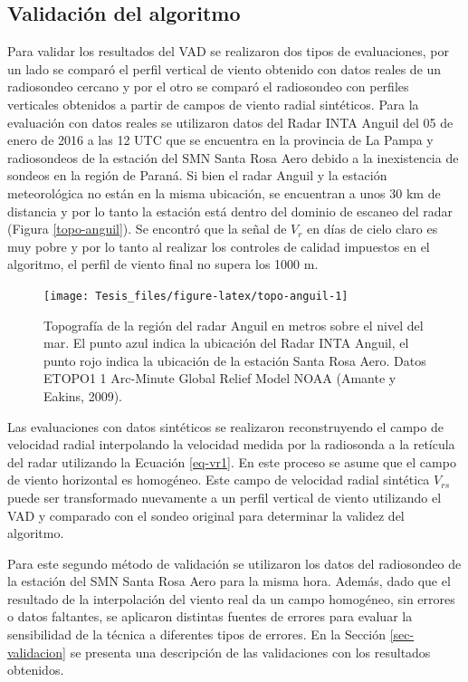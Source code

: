 \documentclass[12pt,spanish,oneside, a4paper]{book}
\begin{document}
\subsection{Validación del algoritmo}\label{validacion-del-algoritmo}

Para validar los resultados del VAD se realizaron dos tipos de
evaluaciones, por un lado se comparó el perfil vertical de viento
obtenido con datos reales de un radiosondeo cercano y por el otro se
comparó el radiosondeo con perfiles verticales obtenidos a partir de
campos de viento radial sintéticos. Para la evaluación con datos reales
se utilizaron datos del Radar INTA Anguil del 05 de enero de 2016 a las
12 UTC que se encuentra en la provincia de La Pampa y radiosondeos de la
estación del SMN Santa Rosa Aero debido a la inexistencia de sondeos en
la región de Paraná. Si bien el radar Anguil y la estación meteorológica
no están en la misma ubicación, se encuentran a unos 30 km de distancia
y por lo tanto la estación está dentro del dominio de escaneo del radar
(Figura \ref{topo-anguil}). Se encontró que la señal de \(V_r\) en días
de cielo claro es muy pobre y por lo tanto al realizar los controles de
calidad impuestos en el algoritmo, el perfil de viento final no supera
los 1000 m.

\begin{figure}

{\centering \texttt{[image: Tesis\_files/figure-latex/topo-anguil-1]} 

}

\caption{Topografía de la región del radar Anguil en metros sobre el nivel del mar. El punto azul indica la ubicación del Radar INTA Anguil, el punto rojo indica la ubicación de la estación Santa Rosa Aero. Datos ETOPO1 1 Arc-Minute Global Relief Model NOAA (Amante y Eakins, 2009). \label{topo-anguil}}\label{fig:topo-anguil}
\end{figure}

Las evaluaciones con datos sintéticos se realizaron reconstruyendo el
campo de velocidad radial interpolando la velocidad medida por la
radiosonda a la retícula del radar utilizando la Ecuación \ref{eq-vr1}.
En este proceso se asume que el campo de viento horizontal es homogéneo.
Este campo de velocidad radial sintética \(V_{rs}\) puede ser
transformado nuevamente a un perfil vertical de viento utilizando el VAD
y comparado con el sondeo original para determinar la validez del
algoritmo.

Para este segundo método de validación se utilizaron los datos del
radiosondeo de la estación del SMN Santa Rosa Aero para la misma hora.
Además, dado que el resultado de la interpolación del viento real da un
campo homogéneo, sin errores o datos faltantes, se aplicaron distintas
fuentes de errores para evaluar la sensibilidad de la técnica a
diferentes tipos de errores. En la Sección \ref{sec-validacion} se
presenta una descripción de las validaciones con los resultados
obtenidos.
\end{document}
